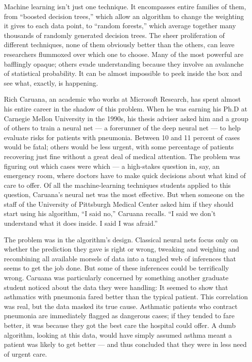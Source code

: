 Machine learning isn't just one technique. It encompasses entire
families of them, from ``boosted decision trees,'' which allow an
algorithm to change the weighting it gives to each data point, to
``random forests,'' which average together many thousands of randomly
generated decision trees. The sheer proliferation of different
techniques, none of them obviously better than the others, can leave
researchers flummoxed over which one to choose. Many of the most
powerful are bafflingly opaque; others evade understanding because they
involve an avalanche of statistical probability. It can be almost
impossible to peek inside the box and see what, exactly, is happening.

Rich Caruana, an academic who works at Microsoft Research, has spent
almost his entire career in the shadow of this problem. When he was
earning his Ph.D at Carnegie Mellon University in the 1990s, his thesis
adviser asked him and a group of others to train a neural net --- a
forerunner of the deep neural net --- to help evaluate risks for
patients with pneumonia. Between 10 and 11 percent of cases would be
fatal; others would be less urgent, with some percentage of patients
recovering just fine without a great deal of medical attention. The
problem was figuring out which cases were which --- a high-stakes
question in, say, an emergency room, where doctors have to make quick
decisions about what kind of care to offer. Of all the machine-learning
techniques students applied to this question, Caruana's neural net was
the most effective. But when someone on the staff of the University of
Pittsburgh Medical Center asked him if they should start using his
algorithm, ``I said no,'' Caruana recalls. ``I said we don't understand
what it does inside. I said I was afraid.''

The problem was in the algorithm's design. Classical neural nets focus
only on whether the prediction they gave is right or wrong, tweaking and
weighing and recombining all available morsels of data into a tangled
web of inferences that seems to get the job done. But some of these
inferences could be terrifically wrong. Caruana was particularly
concerned by something another graduate student noticed about the data
they were handling: It seemed to show that asthmatics with pneumonia
fared better than the typical patient. This correlation was real, but
the data masked its true cause. Asthmatic patients who contract
pneumonia are immediately flagged as dangerous cases; if they tended to
fare better, it was because they got the best care the hospital could
offer. A dumb algorithm, looking at this data, would have simply assumed
asthma meant a patient was likely to get better --- and thus concluded
that they were in less need of urgent care.

